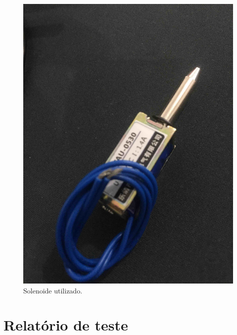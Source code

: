 \begin{figure}[!h]
            \centering
         	\includegraphics[scale= 0.06]{figuras/solenoide.jpg}
            \caption{Solenoide utilizado.}
            \label{solenoide}
\end{figure}

	
\section{Relatório de teste}

